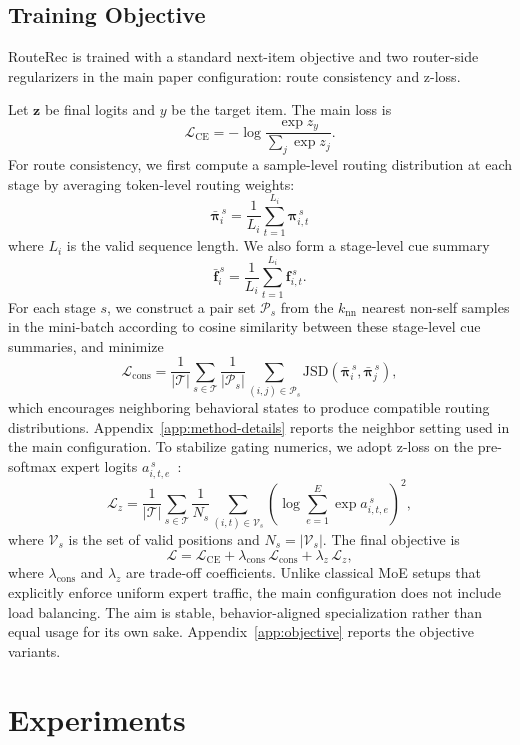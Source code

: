 \documentclass[sigconf,review,anonymous]{acmart}
\begin{document}
\subsection{Training Objective}
\label{sec:training-objective}

RouteRec is trained with a standard next-item objective and two router-side regularizers in the main paper configuration: route consistency and z-loss.

Let $\mathbf{z}$ be final logits and $y$ be the target item. The main loss is
\[
\mathcal{L}_{\mathrm{CE}}
=
-\log \frac{\exp z_y}{\sum_{j}\exp z_j}.
\]
For route consistency, we first compute a sample-level routing distribution at each stage by averaging token-level routing weights:
\[
\bar{\boldsymbol{\pi}}_i^{\,s}
=
\frac{1}{L_i}\sum_{t=1}^{L_i}\boldsymbol{\pi}_{i,t}^{\,s}
\]
where $L_i$ is the valid sequence length. We also form a stage-level cue summary
\[
\bar{\mathbf{f}}_i^{\,s}
=
\frac{1}{L_i}\sum_{t=1}^{L_i}\mathbf{f}_{i,t}^{\,s}.
\]
For each stage $s$, we construct a pair set $\mathcal{P}_s$ from the $k_{\mathrm{nn}}$ nearest non-self samples in the mini-batch according to cosine similarity between these stage-level cue summaries, and minimize
\[
\mathcal{L}_{\mathrm{cons}}
=
\frac{1}{|\mathcal{T}|}
\sum_{s \in \mathcal{T}}
\frac{1}{|\mathcal{P}_s|}
\sum_{(i,j)\in \mathcal{P}_s}
\mathrm{JSD}\!\left(\bar{\boldsymbol{\pi}}_i^{\,s}, \bar{\boldsymbol{\pi}}_j^{\,s}\right),
\]
which encourages neighboring behavioral states to produce compatible routing distributions. Appendix~\ref{app:method-details} reports the neighbor setting used in the main configuration.
To stabilize gating numerics, we adopt z-loss on the pre-softmax expert logits $a_{i,t,e}^{\,s}$~\cite{zoph2022stmoe}:
\[
\mathcal{L}_{z}
=
\frac{1}{|\mathcal{T}|}
\sum_{s \in \mathcal{T}}
\frac{1}{N_s}
\sum_{(i,t)\in\mathcal{V}_s}
\left(
\log \sum_{e=1}^{E}\exp a_{i,t,e}^{\,s}
\right)^2,
\]
where $\mathcal{V}_s$ is the set of valid positions and $N_s=|\mathcal{V}_s|$. The final objective is
\[
\mathcal{L}
=
\mathcal{L}_{\mathrm{CE}}
+
\lambda_{\mathrm{cons}}\,\mathcal{L}_{\mathrm{cons}}
+
\lambda_{z}\,\mathcal{L}_{z},
\]
where $\lambda_{\mathrm{cons}}$ and $\lambda_z$ are trade-off coefficients. Unlike classical MoE setups that explicitly enforce uniform expert traffic, the main configuration does not include load balancing. The aim is stable, behavior-aligned specialization rather than equal usage for its own sake. Appendix~\ref{app:objective} reports the objective variants.

\section{Experiments}
\label{sec:experiments}
\end{document}
